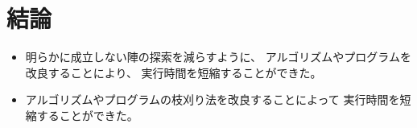 \section{結論}
\begin{itemize}
\item 明らかに成立しない陣の探索を減らすように、
	アルゴリズムやプログラムを改良することにより、
	実行時間を短縮することができた。
\item アルゴリズムやプログラムの枝刈り法を改良することによって
	実行時間を短縮することができた。
\end{itemize}
